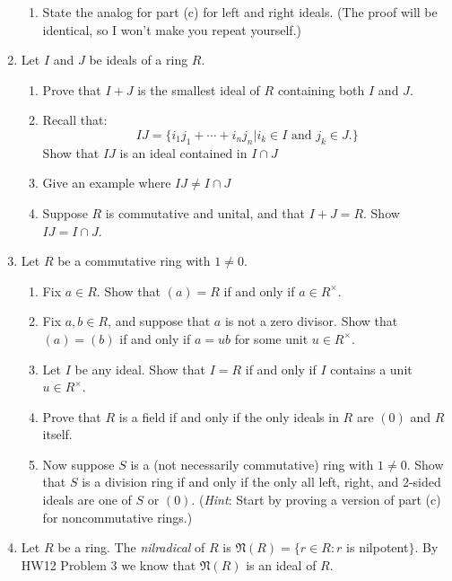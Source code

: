 \documentclass[11pt]{article}
\newcommand{\fN}{\mathfrak{N}}
\begin{document}
\begin{enumerate}
{\begin{enumerate}
{    \[RAR := \{r_1a_1s_1+\cdots+r_na_ns_n|r_i,s_i\in R\text{ and }a_i\in A.\}\]
    \[(A):=\bigcap_{A\subset I\text{ an ideal}}I.\]
    }
    Prove that $RAR$ is an ideal of $R$, and that $RAR = (A)$.
    \item{
    State the analog for part (c) for left and right ideals.  (The proof will be identical, so I won't make you repeat yourself.)
    }
  \end{enumerate}
  }
  \item{
  Let $I$ and $J$ be ideals of a ring $R$.
  \begin{enumerate}
    \item{Prove that $I+J$ is the smallest ideal of $R$ containing both $I$ and $J$.}
    \item{Recall that:
    \[IJ = \{i_1j_1 + \cdots + i_nj_n|i_k\in I\text{ and }j_k\in J.\}\]
    Show that $IJ$ is an ideal contained in $I\cap J$}
    \item{Give an example where $IJ\not=I\cap J$}
    \item{Suppose $R$ is commutative and unital, and that $I+J=R$.  Show $IJ=I\cap J$.}
  \end{enumerate}
  }
  \item{
  Let $R$ be a commutative ring with $1\not=0$.
  \begin{enumerate}
    \item{
    Fix $a\in R$.  Show that $(a)=R$ if and only if $a\in R^\times$.
    }
    \item{
    Fix $a,b\in R$, and suppose that $a$ is not a zero divisor.  Show that $(a)=(b)$ if and only if $a = ub$ for some unit $u\in R^\times$.
    }
    \item{
    Let $I$ be any ideal.  Show that $I=R$ if and only if $I$ contains a unit $u\in R^\times$.
    }
    \item{
    Prove that $R$ is a field if and only if the only ideals in $R$ are $(0)$ and $R$ itself.
    }
    \item{
    Now suppose $S$ is a (not necessarily commutative) ring with $1\not=0$.  Show that $S$ is a division ring if and only if the only all left, right, and 2-sided ideals are one of $S$ or $(0)$.  (\textit{Hint}: Start by proving a version of part (c) for noncommutative rings.)
    }
  \end{enumerate}
  }
  \item{
  Let $R$ be a ring.  The \textit{nilradical} of $R$ is $\fN(R)=\{r\in R:r$ is nilpotent$\}$.  By HW12 Problem 3 we know that $\fN(R)$ is an ideal of $R$.
  \begin{enumerate}

\end{enumerate}}
\end{enumerate}
\end{document}
